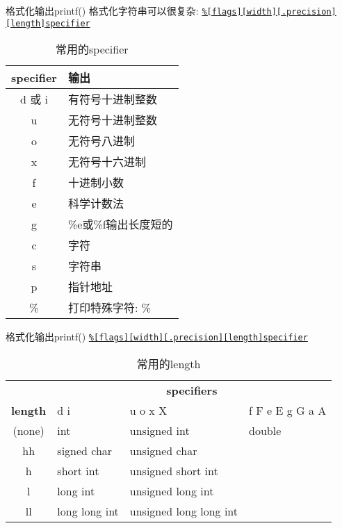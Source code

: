 \begin{frame}[fragile]{格式化输出printf()}
格式化字符串可以很复杂:
\href{http://www.cplusplus.com/reference/cstdio/printf/}{\texttt{\%[flags][width][.precision][length]\alert{specifier}}}
\begin{table}
\begin{tabular}{@{} cl @{}}
\toprule
\textbf{specifier} & \textbf{输出} \\
\midrule
d 或 i & 有符号十进制整数 \\
u & 无符号十进制整数 \\
o & 无符号八进制 \\
x & 无符号十六进制 \\
f & 十进制小数 \\
e & 科学计数法 \\
g & \%e或\%f输出长度短的 \\
c & 字符 \\
s & 字符串 \\
p & 指针地址 \\
\% & 打印特殊字符: \% \\
\bottomrule
\end{tabular}
\caption{常用的specifier}
\end{table}
\end{frame}

\begin{frame}[fragile]{格式化输出printf()}
\href{http://www.cplusplus.com/reference/cstdio/printf/}{\texttt{\%[flags][width][.precision]\alert{[length]}specifier}}
\begin{table}
\begin{tabular}{clll}
\toprule
 & \multicolumn{3}{c}{\textbf{specifiers}} \\
\textbf{length} & d i & u o x X & f F e E g G a A \\
\midrule
(none) & int & unsigned int & double \\
hh & signed char & unsigned char &  \\
h & short int & unsigned short int &  \\
l & long int & unsigned long int &  \\
ll & long long int & unsigned long long int & \\
\bottomrule
\end{tabular}
\caption{常用的length}
\end{table}
\end{frame}

